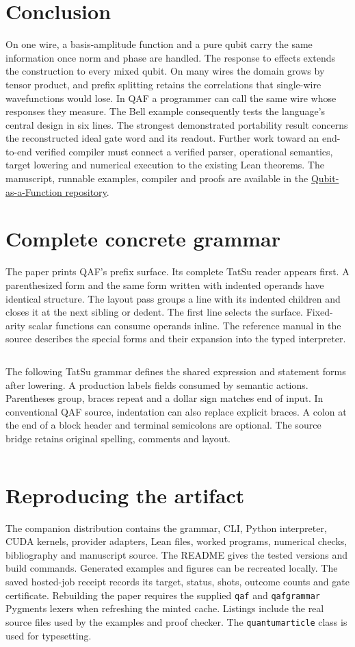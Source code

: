 \documentclass[a4paper,onecolumn,11pt,unpublished]{quantumarticle}
\begin{document}
\section{Conclusion}
On one wire, a basis-amplitude function and a pure qubit carry the same information once norm and phase are handled. The response to effects extends the construction to every mixed qubit. On many wires the domain grows by tensor product, and prefix splitting retains the correlations that single-wire wavefunctions would lose. In QAF a programmer can call the same wire whose responses they measure. The Bell example consequently tests the language's central design in six lines. The strongest demonstrated portability result concerns the reconstructed ideal gate word and its readout. Further work toward an end-to-end verified compiler must connect a verified parser, operational semantics, target lowering and numerical execution to the existing Lean theorems.
\appendix
\noindent The manuscript, runnable examples, compiler and proofs are available in the
\href{https://github.com/mingusb/qubit-as-a-function}{Qubit-as-a-Function repository}.
\section{Complete concrete grammar}
\label{sec:grammar}
The paper prints QAF's prefix surface. Its complete TatSu reader appears first. A parenthesized form and the same form written with indented operands have identical structure. The layout pass groups a line with its indented children and closes it at the next sibling or dedent. The first line selects the surface. Fixed-arity scalar functions can consume operands inline. The reference manual in the source describes the special forms and their expansion into the typed interpreter.
\inputminted[fontsize=\footnotesize]{qafgrammar}{prefix.ebnf}
The following TatSu grammar defines the shared expression and statement forms after lowering. A production labels fields consumed by semantic actions. Parentheses group, braces repeat and a dollar sign matches end of input. In conventional QAF source, indentation can also replace explicit braces. A colon at the end of a block header and terminal semicolons are optional. The source bridge retains original spelling, comments and layout.
\inputminted[fontsize=\footnotesize]{qafgrammar}{qaf.ebnf}
\section{Reproducing the artifact}
The companion distribution contains the grammar, CLI, Python interpreter, CUDA kernels, provider adapters, Lean files, worked programs, numerical checks, bibliography and manuscript source. The README gives the tested versions and build commands. Generated examples and figures can be recreated locally. The saved hosted-job receipt records its target, status, shots, outcome counts and gate certificate. Rebuilding the paper requires the supplied \texttt{qaf} and \texttt{qafgrammar} Pygments lexers when refreshing the minted cache. Listings include the real source files used by the examples and proof checker. The \texttt{quantumarticle} class is used for typesetting.

\end{document}
